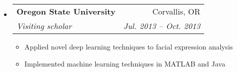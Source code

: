 \documentclass[letterpaper,11pt]{article}
\makeatletter
\newcommand{\ressubheading}[4]{
\begin{tabular*}{6.5in}{l@{\extracolsep{\fill}}r}
		\textbf{#1} & #2 \\
		\textit{#3} & \textit{#4} \\
\end{tabular*}\vspace{-6pt}}
\makeatother
\begin{document}
\begin{itemize}
		\item			
			\ressubheading{Oregon State University}{Corvallis, OR}{Visiting scholar}{Jul. 2013 -- Oct. 2013}
				{ \small			
				\begin{itemize}
					\item Applied novel deep learning techniques to facial expression analysis
					\item Implemented machine learning techniques in MATLAB and Java
				\end{itemize}
				}
	

	\end{itemize}  %
\end{document}
